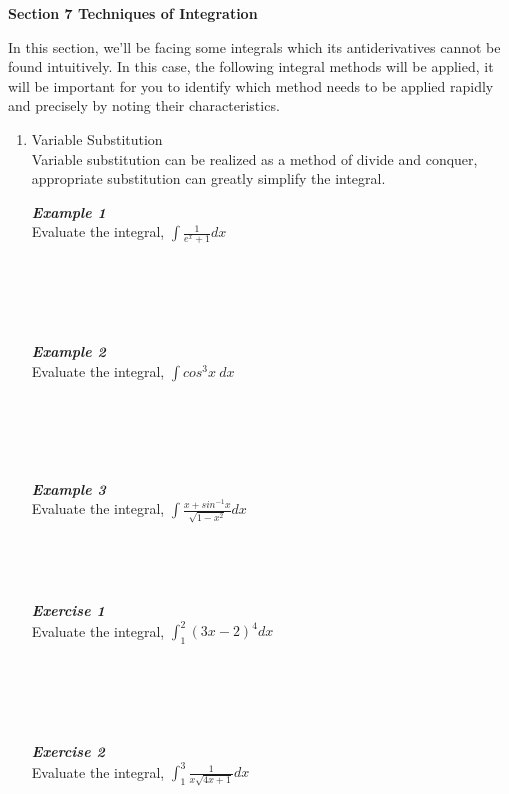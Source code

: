 \documentclass[12px]{article}
\begin{document}
\begin{center}
    \Large\textbf{Section 7 Techniques of Integration}
\end{center}
\hspace*{2em}In this section, we'll be facing some integrals which its antiderivatives cannot be found intuitively. In this case, the following integral methods will be applied, it will be important for you to identify which method needs to be applied rapidly and precisely by noting their characteristics.
\begin{enumerate}
    \item Variable Substitution\\
    \hspace*{2em}Variable substitution can be realized as a method of divide and conquer, appropriate substitution can greatly simplify the integral.
    \begin{multicols}{2}
    \textit{\textbf{Example 1}}\\
    Evaluate the integral, $\int\frac{1}{e^x+1}dx$\\
    \\
    \\
    \\
    \\
    \\
    \textit{\textbf{Example 2}}\\
    Evaluate the integral, $\int cos^3x\ dx$\\
    \\
    \\
    \\
    \\
    \\
    \textit{\textbf{Example 3}}\\
    Evaluate the integral, $\int\frac{x+sin^{-1}x}{\sqrt{1-x^2}}dx$\\
    \\
    \\
    \\
    \\
    \textit{\textbf{Exercise 1}}\\
    Evaluate the integral, $\int_{1}^{2}(3x-2)^4dx$\\
    \\
    \\
    \\
    \\
    \\
    \textit{\textbf{Exercise 2}}\\
    Evaluate the integral, $\int_{1}^{3}\frac{1}{x\sqrt{4x+1}}dx$\\

\end{multicols}
\end{enumerate}
\end{document}
